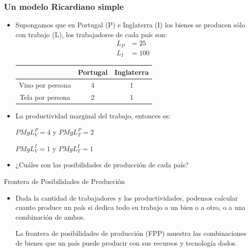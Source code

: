 \documentclass{beamer}
\begin{document}
\begin{frame}
    \frametitle{Un modelo Ricardiano simple}
    \begin{itemize}
        \item Supongamos que en Portugal (P) e Inglaterra (I) los bienes se producen sólo con trabajo (L), los trabajadores de cada país son:
            \begin{equation*}
                \begin{aligned}
                    L_P & = 25 \\
                    L_I & = 100
                \end{aligned}
            \end{equation*}
            \begin{center}
            \begin{tabular}{|c|c|c|} \hline
                & Portugal & Inglaterra \\ \hline
                Vino por persona   & 4 & 1 \\ \hline
                Tela por persona   & 2 & 1 \\ \hline     
            \end{tabular}
            \end{center}
        \item La productividad marginal del trabajo, entonces es: 
            \begin{center}
                $PMgL_V^{P} = 4$ y $PMgL_T^{P} = 2$
            \end{center}
            \begin{center}
                $PMgL_V^{I} = 1$ y $PMgL_T^{I} = 1$
            \end{center}
        \item ¿Cuáles son las posibilidades de producción de cada país?    
    \end{itemize} 
\end{frame}

\begin{frame}{Frontera de Posibilidades de Producción}
    \begin{itemize}
        \item Dada la cantidad de trabajadores y las productividades, podemos calcular cuanto produce un país si dedica todo su trabajo a un bien o a otro, o a una combinación de ambos.
        \begin{boxA}
            \centering
            La frontera de posibilidades de producción (FPP) muestra las combinaciones de bienes que un país puede producir con sus recursos y tecnología dados.
        \end{boxA}
    \end{itemize}

\end{frame}
\end{document}
